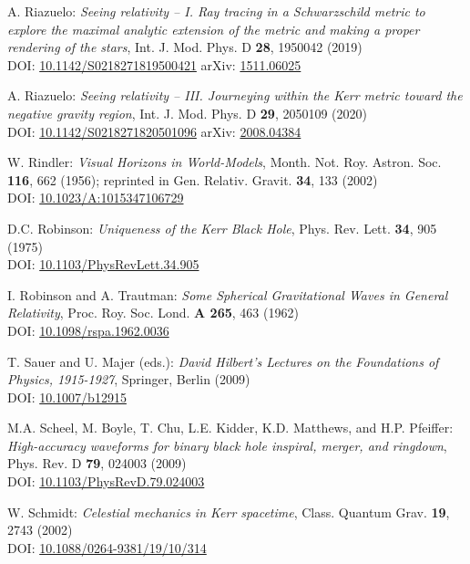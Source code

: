 \begin{thebibliography}{123}
A. Riazuelo:
{\em Seeing relativity -- I. Ray tracing in a Schwarzschild metric to explore the maximal analytic extension of the metric and making a proper rendering of the stars},
Int. J. Mod. Phys. D {\bf 28}, 1950042 (2019)\\
DOI: \href{https://doi.org/10.1142/S0218271819500421}{10.1142/S0218271819500421}
\hfill
arXiv: \href{https://arxiv.org/abs/1511.06025}{1511.06025}

A. Riazuelo:
{\em Seeing relativity -- III. Journeying within the Kerr metric toward the negative gravity region},
Int. J. Mod. Phys. D {\bf 29}, 2050109 (2020)\\
DOI: \href{https://doi.org/10.1142/S0218271820501096}{10.1142/S0218271820501096}\hfill
arXiv: \href{https://arxiv.org/abs/2008.04384}{2008.04384}

W. Rindler: {\em Visual Horizons in World-Models},
Month. Not. Roy. Astron. Soc. {\bf 116}, 662 (1956);
reprinted in Gen. Relativ. Gravit. {\bf 34}, 133 (2002)\\
DOI: \href{https://doi.org/10.1023/A:1015347106729}{10.1023/A:1015347106729}

D.C. Robinson: {\em Uniqueness of the Kerr Black Hole},
Phys. Rev. Lett. {\bf 34}, 905 (1975)\\
DOI: \href{https://doi.org/10.1103/PhysRevLett.34.905}{10.1103/PhysRevLett.34.905}

I. Robinson and A. Trautman: {\em Some Spherical Gravitational Waves in General Relativity},
Proc. Roy. Soc. Lond. {\bf A 265}, 463 (1962)\\
DOI: \href{https://doi.org/10.1098/rspa.1962.0036}{10.1098/rspa.1962.0036}

T. Sauer and U. Majer (eds.):
{\em David Hilbert’s Lectures on the Foundations of Physics, 1915-1927},
Springer, Berlin (2009)\\
DOI: \href{https://doi.org/10.1007/b12915}{10.1007/b12915}

M.A. Scheel, M. Boyle, T. Chu, L.E. Kidder, K.D. Matthews, and H.P. Pfeiffer:
{\em High-accuracy waveforms for binary black hole inspiral, merger, and ringdown},
Phys. Rev. D {\bf 79}, 024003 (2009)\\
DOI: \href{https://doi.org/10.1103/PhysRevD.79.024003}{10.1103/PhysRevD.79.024003}

W. Schmidt:
{\em Celestial mechanics in Kerr spacetime},
Class. Quantum Grav. {\bf 19}, 2743 (2002)\\
DOI: \href{https://doi.org/10.1088/0264-9381/19/10/314}{10.1088/0264-9381/19/10/314}


\end{thebibliography}
